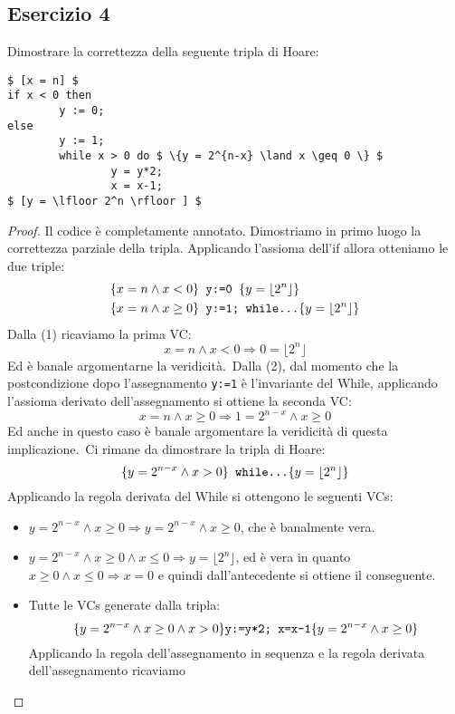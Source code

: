 \subsection{Esercizio 4}
Dimostrare la correttezza della seguente tripla di Hoare:
\begin{lstlisting}[mathescape, numberfirstline=false, frame=single]
$ [x = n] $
if x < 0 then
        y := 0;
else
        y := 1;
        while x > 0 do $ \{y = 2^{n-x} \land x \geq 0 \} $
                y = y*2;
                x = x-1;
$ [y = \lfloor 2^n \rfloor ] $
\end{lstlisting}

\begin{proof}
Il codice è completamente annotato. Dimostriamo in primo luogo la correttezza parziale della tripla. Applicando l'assioma dell'if allora otteniamo le due triple:
\begin{align}
& \{x=n \land x<0 \} \text{\texttt{ y:=0 }} \{y= \lfloor 2^n \rfloor \} \\
& \{x=n \land x \geq 0 \} \text{\texttt{ y:=1; while}} \texttt{\dots } \{ y= \lfloor 2^n \rfloor \}
\end{align}
Dalla (1) ricaviamo la prima VC:
\[ x = n \land x<0 \Rightarrow 0 = \lfloor 2^n \rfloor \]
Ed è banale argomentarne la veridicità.\
Dalla (2), dal momento che la postcondizione dopo l'assegnamento \texttt{y:=1} è l'invariante del While, applicando l'assioma derivato dell'assegnamento si ottiene la seconda VC:
\[ x=n \land x \geq 0 \Rightarrow 1 = 2^{n-x} \land x \geq 0 \]
Ed anche in questo caso è banale argomentare la veridicità di questa implicazione.\
Ci rimane da dimostrare la tripla di Hoare:
\[ \{ y=2^{n-x} \land x>0 \} \text{\texttt{ while}} \texttt{\dots } \{y= \lfloor 2^n \rfloor \} \]
Applicando la regola derivata del While si ottengono le seguenti VCs:
\begin{itemize}
  \item $ y=2^{n-x} \land x \geq 0
        \Rightarrow y=2^{n-x} \land x \geq 0 $,
        che è banalmente vera.
  \item $ y=2^{n-x} \land x \geq 0 \land x \leq 0
        \Rightarrow y = \lfloor 2^n \rfloor $,
        ed è vera in quanto
        $ x \geq 0 \land x \leq 0\Rightarrow x = 0 $
        e quindi dall'antecedente si ottiene il conseguente.
  \item Tutte le VCs generate dalla tripla:
        \[ \{y=2^{n-x} \land x \geq 0 \land x>0 \}
        \text{\texttt{y:=y*2; x=x-1}}
        \{y=2^{n-x} \land x \geq 0 \} \]
        Applicando la regola dell'assegnamento in sequenza
        e la regola derivata dell'assegnamento ricaviamo

\end{itemize}
\end{proof}
